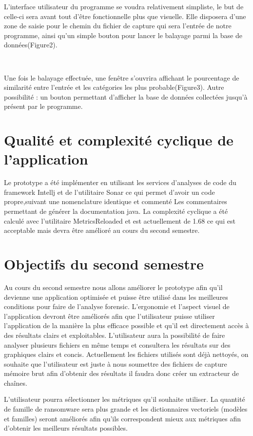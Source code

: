 \documentclass[a4paper, 12pt, twoside]{article}
\begin{document}
L'interface utilisateur du programme se voudra relativement simpliste, le but de celle-ci sera avant tout d'être fonctionnelle plus que visuelle. 
Elle disposera d'une zone de saisie pour le chemin du fichier de capture qui sera l'entrée de notre programme, ainsi qu'un simple bouton pour lancer le balayage parmi la base de données(Figure2).

~\par
Une fois le balayage effectuée, une fenêtre s'ouvrira affichant le pourcentage de similarité entre l'entrée et les catégories les plus probable(Figure3). 
Autre possibilité : un bouton permettant d'afficher la base de données collectées jusqu'à présent par le programme.

\section{Qualité et complexité cyclique de l'application}
Le prototype a été implémenter en utilisant les services d'analyses de code du framework Intellj et de l'utilitaire Sonar ce qui permet d'avoir un code propre,suivant une nomenclature identique et commenté Les commentaires permettant de générer la documentation java.
La complexité cyclique a été calculé avec l'utilitaire MetricsReloaded et est actuellement de 1.68 ce qui est acceptable mais devra être amélioré au cours du second semestre.

\section{Objectifs du second semestre}
Au cours du second semestre nous allons améliorer le prototype afin qu'il devienne une application optimisée et puisse être utilisé dans les meilleures conditions pour faire de l'analyse forensic.
L'ergonomie et l'aspect visuel de l'application devront être améliorés afin que l'utilisateur puisse utiliser l'application de la manière la plus efficace possible et qu'il est directement accès à des résultats clairs et exploitables. L'utilisateur aura la possibilité de faire analyser plusieurs fichiers en même temps et consultera les résultats sur des graphiques clairs et concis.
Actuellement les fichiers utilisés sont déjà nettoyés, on souhaite que l'utilisateur est juste à nous soumettre des fichiers de capture mémoire brut afin d'obtenir des résultats il faudra donc créer un extracteur de chaînes.

L'utilisateur pourra sélectionner les métriques qu'il souhaite utiliser.
La quantité de famille de ransomware sera plus grande et les dictionnaires vectoriels (modèles et familles) seront améliorés afin qu'ils correspondent mieux aux métriques afin d'obtenir les meilleurs résultats possibles.
\end{document}
